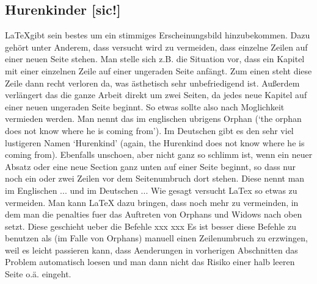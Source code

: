 \subsection{Hurenkinder [sic!]}
\LaTeX gibt sein bestes um ein stimmiges Erscheinungsbild hinzubekommen. Dazu gehört unter Anderem, dass versucht wird zu vermeiden, dass einzelne Zeilen auf einer neuen Seite stehen. Man stelle sich z.B. die Situation vor, dass ein Kapitel mit einer einzelnen Zeile auf einer ungeraden Seite anfängt. Zum einen steht diese Zeile dann recht verloren da, was ästhetisch sehr unbefriedigend ist. Außerdem verlängert das die ganze Arbeit direkt um zwei Seiten, da jedes neue Kapitel auf einer neuen ungeraden Seite beginnt. So etwas sollte also nach Moglichkeit vermieden werden. Man nennt das im englischen ubrigens Orphan (`the orphan does not know where he is coming from'). Im Deutschen gibt es den sehr viel lustigeren Namen `Hurenkind' (again, the Hurenkind does not know where he is coming from). 
Ebenfalls unschoen, aber nicht ganz so schlimm ist, wenn ein neuer Absatz oder eine neue Section ganz unten auf einer Seite beginnt, so dass nur noch ein oder zwei Zeilen vor dem Seitenumbruch dort stehen. Diese nennt man im Englischen ... und im Deutschen ... 
Wie gesagt versucht LaTex so etwas zu vermeiden. Man kann LaTeX dazu bringen, dass noch mehr zu vermeinden, in dem man die penalties fuer das Auftreten von Orphans und Widows nach oben setzt. Diese geschieht ueber
die Befehle
xxx
xxx
Es ist besser diese Befehle zu benutzen als (im Falle von Orphans) manuell einen Zeilenumbruch zu erzwingen, weil es leicht passieren kann, dass Aenderungen in vorherigen Abschnitten das Problem automatisch loesen und man dann nicht das Risiko einer halb leeren Seite o.ä. eingeht.


